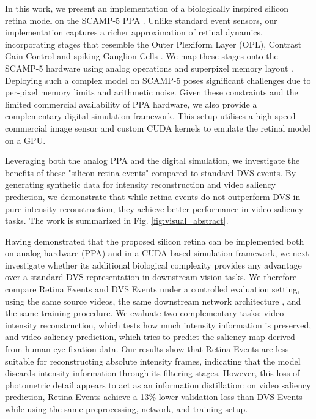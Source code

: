 \documentclass{article}
\begin{document}
In this work, we present an implementation of a biologically inspired silicon retina model on the SCAMP-5 PPA \cite{dudek_sensor-level_2022, carey_100000_2013}. Unlike standard event sensors, our implementation captures a richer approximation of retinal dynamics, incorporating stages that resemble the Outer Plexiform Layer (OPL), Contrast Gain Control and spiking Ganglion Cells \cite{wohrer_virtual_2009, philip_neuromorphic_2025}. We map these stages onto the SCAMP-5 hardware using analog operations and superpixel memory layout \cite{martel_pixel_interlacing_2015}.
Deploying such a complex model on SCAMP-5 poses significant challenges due to per-pixel memory limits and arithmetic noise. Given these constraints and the limited commercial availability of PPA hardware, we also provide a complementary digital simulation framework. This setup utilises a high-speed commercial image sensor and custom CUDA kernels to emulate the retinal model on a GPU. 

Leveraging both the analog PPA and the digital simulation, we investigate the benefits of these "silicon retina events" compared to standard DVS events. By generating synthetic data for intensity reconstruction and video saliency prediction, we demonstrate that while retina events do not outperform DVS in pure intensity reconstruction, they achieve better performance in video saliency tasks. The work is summarized in Fig. \ref{fig:visual_abstract}.

Having demonstrated that the proposed silicon retina can be implemented both on analog hardware (PPA) and in a CUDA-based simulation framework, we next investigate whether its additional biological complexity provides any advantage over a standard DVS representation in downstream vision tasks. We therefore compare Retina Events and DVS Events under a controlled evaluation setting, using the same source videos, the same downstream network architecture \cite{scheerlinck_fast_2020}, and the same training procedure. We evaluate two complementary tasks: video intensity reconstruction, which tests how much intensity information is preserved, and video saliency prediction, which tries to predict the saliency map derived from human eye-fixation data. Our results show that Retina Events are less suitable for reconstructing absolute intensity frames, indicating that the model discards intensity information through its filtering stages. However, this loss of photometric detail appears to act as an information distillation: on video saliency prediction, Retina Events achieve a 13\% lower validation loss than DVS Events while using the same preprocessing, network, and training setup.
\end{document}
